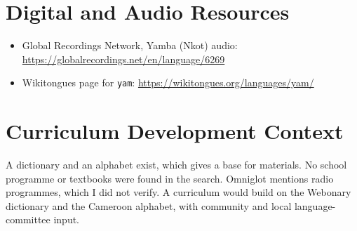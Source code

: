 \documentclass[12pt]{article}
\begin{document}
\section{Digital and Audio Resources}
\begin{itemize}
\item Global Recordings Network, Yamba (Nkot) audio: \url{https://globalrecordings.net/en/language/6269}
\item Wikitongues page for \texttt{yam}: \url{https://wikitongues.org/languages/yam/}
\end{itemize}

\section{Curriculum Development Context}
A dictionary and an alphabet exist, which gives a base for materials. No school programme or textbooks were found in the search. Omniglot mentions radio programmes, which I did not verify. A curriculum would build on the Webonary dictionary and the Cameroon alphabet, with community and local language-committee input.
\end{document}
